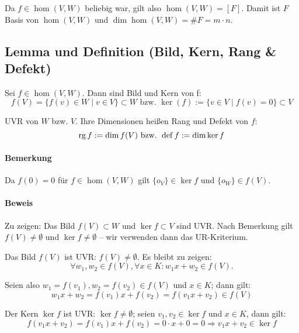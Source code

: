 	Da $f\in\hom (V,W)$ beliebig war, gilt also $\hom (V,W) = [F]$. Damit ist $F$ Basis von $\hom (V,W)$ und $\dim\hom (V,W) = \# F = m\cdot n$.
	
\subsection{Lemma und Definition (Bild, Kern, Rang \& Defekt)}
	\begin{Definition}
		Sei $f\in \hom (V,W)$. Dann sind Bild und Kern von f:
		\begin{equation*}
			f(V) = \{f(v)\in W\mid v\in V \}\subset W \text{ bzw. } \ker (f) := \{v\in V\mid f(v) = 0 \} \subset V
		\end{equation*}
	
	UVR von $W$ bzw. $V$. Ihre Dimensionen heißen Rang und Defekt von $f$:
		\begin{equation*}
			\operatorname{rg} f := \dim f(V) \text{ bzw. } \operatorname{def} f := \dim \ker f
		\end{equation*}
	\end{Definition}

\paragraph{Bemerkung}
	Da $f(0)=0$ für  $f\in \hom (V,W)$ gilt $\{o_V \}\in \ker f$ und $\{o_W \}\in f(V)$.

\paragraph{Beweis}
	Zu zeigen: Das Bild $f(V)\subset W$ und $\ker f\subset V$ sind UVR. Nach Bemerkung gilt $f(V)\neq \emptyset$ und $\ker f \neq \emptyset$ -- wir verwenden dann das UR-Kriterium.
	
	Das Bild $f(V)$ ist UVR: $f(V) \neq \emptyset$. Es bleibt zu zeigen:
		\begin{equation*}
			\forall w_1,w_2\in f(V), \forall x\in K: w_1x+w_2 \in f(V).
		\end{equation*}
	
	Seien also $w_1 = f(v_1), w_2 = f(v_2) \in f(V)$ und $x\in K$; dann gilt:
		\begin{equation*}
			w_1x+w_2 = f(v_1)x+f(v_2) = f(v_1x+v_2)\in f(V)
		\end{equation*}
		
	Der Kern $\ker f$ ist UVR: $\ker f\neq \emptyset$; seien $v_1,v_2\in \ker f$ und $x\in K$, dann gilt:
		\begin{equation*}
			f(v_1x+v_2) = f(v_1)x+f(v_2) = 0\cdot x + 0 = 0 \Rightarrow v_1x+v_2\in \ker f
		\end{equation*}


